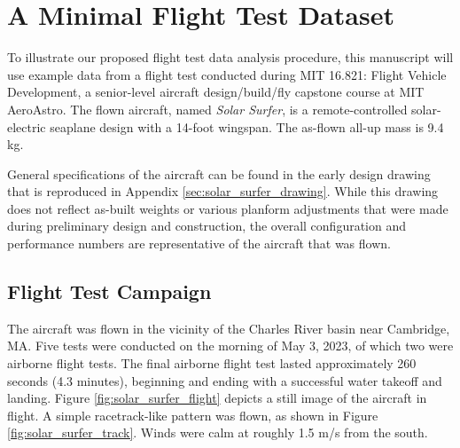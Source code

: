 \section{A Minimal Flight Test Dataset}

To illustrate our proposed flight test data analysis procedure, this manuscript will use example data from a flight test conducted during MIT 16.821: Flight Vehicle Development, a senior-level aircraft design/build/fly capstone course at MIT AeroAstro. The flown aircraft, named \emph{Solar Surfer}, is a remote-controlled solar-electric seaplane design with a 14-foot wingspan. The as-flown all-up mass is 9.4 kg.

General specifications of the aircraft can be found in the early design drawing that is reproduced in Appendix \ref{sec:solar_surfer_drawing}. While this drawing does not reflect as-built weights or various planform adjustments that were made during preliminary design and construction, the overall configuration and performance numbers are representative of the aircraft that was flown.

\subsection{Flight Test Campaign}

The aircraft was flown in the vicinity of the Charles River basin near Cambridge, MA. Five tests were conducted on the morning of May 3, 2023, of which two were airborne flight tests. The final airborne flight test lasted approximately 260 seconds (4.3 minutes), beginning and ending with a successful water takeoff and landing. Figure \ref{fig:solar_surfer_flight} depicts a still image of the aircraft in flight. A simple racetrack-like pattern was flown, as shown in Figure \ref{fig:solar_surfer_track}. Winds were calm at roughly 1.5 m/s from the south.

